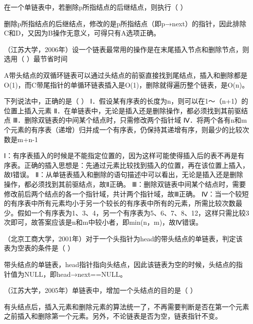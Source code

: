 \question 在一个单链表中，若删除p所指结点的后继结点，则执行（ ）
\par{}
\begin{solution}删除p所指结点的后继结点，修改的是p所指结点（即p→next）的指针，因此排除C和D，又因为B操作无意义，可得只有A选项正确。
\end{solution}
\question （江苏大学，2006年）设一个链表最常用的操作是在末尾插入节点和删除节点，则选用（
）最节省时间
\par{}
\begin{solution}A带头结点的双循环链表可以通过头结点的前驱直接找到尾结点，插入和删除都是O(1)，而C带尾指针的单循环链表插入是O(1)，删除就得遍历整个链表，是O(n)。
\end{solution}
\question 下列说法中，正确的是（ ）
Ⅰ．假设某有序表的长度为n，则可以在1～（n+1）的位置上插入元素
Ⅱ．在单链表中，无论是插入还是删除操作，都必须找到其前驱结点
Ⅲ．删除双链表的中间某个结点时，只需修改两个指针域
Ⅳ．将两个各有n和m个元素的有序表（递增）归并成一个有序表，仍保持其递增有序，则最少的比较次数是m+n-1
\par{}
\begin{solution}Ⅰ：有序表插入的时候是不能指定位置的，因为这样可能使得插入后的表不再是有序表。正确的插入思想是：先通过元素比较找到插入的位置，再在该位置上插入，故Ⅰ错误。
Ⅱ：从单链表插入和删除的语句描述中可以看出，无论是插入还是删除操作，都必须找到其前驱结点，故Ⅱ正确。
Ⅲ：删除双链表中间某个结点时，需要修改前后两个结点的各一个指针域，共计两个指针域，故Ⅲ正确。
Ⅳ：当一个较短的有序表中所有元素均小于另一个较长的有序表中所有的元素，所需比较次数最少。假如一个有序表为1、3、4，另一个有序表为5、6、7、8、12，这样只需比较3次即可，故答案应该是n和m中较小者，即min(n，m)，故Ⅳ错误。
\end{solution}
\question （北京工商大学，2001年）对于一个头指针为head的带头结点的单链表，判定该表为空表的条件是（
）
\par{}
\begin{solution}带头结点的单链表，head指针指向头结点，因此该链表为空的时候，头结点的指针值为NULL，即head→next==NULL。
\end{solution}
\question （江苏大学，2005年）单链表中，增加一个头结点的目的是（ ）
\par{}
\begin{solution}有头结点后，插入元素和删除元素的算法统一了，不再需要判断是否在第一个元素之前插入和删除第一个元素。另外，不论链表是否为空，链表指针不变。
\end{solution}

